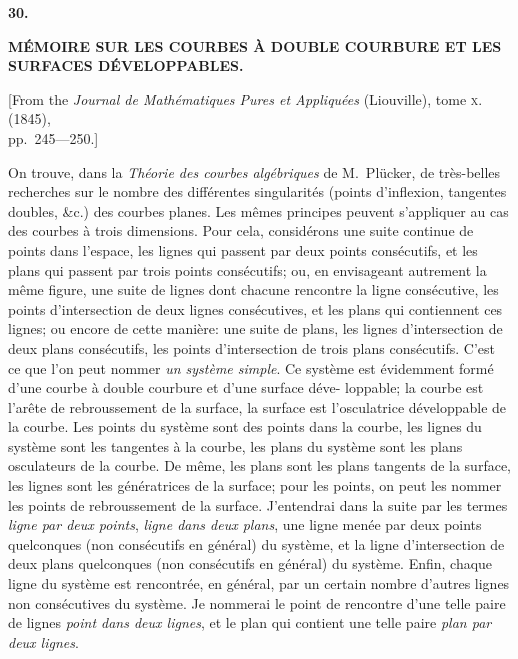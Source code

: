 \documentclass[11pt,a4paper]{article}
\begin{document}
\newpage
{}
\setcounter{page}{207}

\begin{center}
{\large\bfseries 30.}
\end{center}
\vspace{0.5em}
\begin{center}
{\large\bfseries M\'{E}MOIRE SUR LES COURBES \`{A} DOUBLE COURBURE ET LES\\[0.3em]
SURFACES D\'{E}VELOPPABLES.}
\end{center}
\vspace{0.5em}
\begin{center}
{[From the \textit{Journal de Math\'{e}matiques Pures et Appliqu\'{e}es} (Liouville), tome \textsc{x}. (1845),\\
pp.~245---250.]}
\end{center}
\vspace{1em}

On trouve, dans la \textit{Th\'{e}orie des courbes alg\'{e}briques} de M.~Pl\"{u}cker, de tr\`{e}s-belles
recherches sur le nombre des diff\'{e}rentes singularit\'{e}s (points d'inflexion, tangentes doubles,
\&c.) des courbes planes. Les m\^{e}mes principes peuvent s'appliquer au cas des courbes
\`{a} trois dimensions. Pour cela, consid\'{e}rons une suite continue de points dans l'espace,
les lignes qui passent par deux points cons\'{e}cutifs, et les plans qui passent par trois
points cons\'{e}cutifs; ou, en envisageant autrement la m\^{e}me figure, une suite de lignes
dont chacune rencontre la ligne cons\'{e}cutive, les points d'intersection de deux lignes
cons\'{e}cutives, et les plans qui contiennent ces lignes; ou encore de cette mani\`{e}re: une
suite de plans, les lignes d'intersection de deux plans cons\'{e}cutifs, les points d'intersection
de trois plans cons\'{e}cutifs. C'est ce que l'on peut nommer \textit{un syst\`{e}me simple}. Ce
syst\`{e}me est \'{e}videmment form\'{e} d'une courbe \`{a} double courbure et d'une surface d\'{e}ve-
loppable; la courbe est l'ar\^{e}te de rebroussement de la surface, la surface est l'osculatrice
d\'{e}veloppable de la courbe. Les points du syst\`{e}me sont des points dans la courbe, les
lignes du syst\`{e}me sont les tangentes \`{a} la courbe, les plans du syst\`{e}me sont les plans
osculateurs de la courbe. De m\^{e}me, les plans sont les plans tangents de la surface,
les lignes sont les g\'{e}n\'{e}ratrices de la surface; pour les points, on peut les nommer les
points de rebroussement de la surface. J'entendrai dans la suite par les termes \textit{ligne
par deux points}, \textit{ligne dans deux plans}, une ligne men\'{e}e par deux points quelconques
(non cons\'{e}cutifs en g\'{e}n\'{e}ral) du syst\`{e}me, et la ligne d'intersection de deux plans
quelconques (non cons\'{e}cutifs en g\'{e}n\'{e}ral) du syst\`{e}me. Enfin, chaque ligne du syst\`{e}me
est rencontr\'{e}e, en g\'{e}n\'{e}ral, par un certain nombre d'autres lignes non cons\'{e}cutives du
syst\`{e}me. Je nommerai le point de rencontre d'une telle paire de lignes \textit{point dans
deux lignes}, et le plan qui contient une telle paire \textit{plan par deux lignes}.
\end{document}
